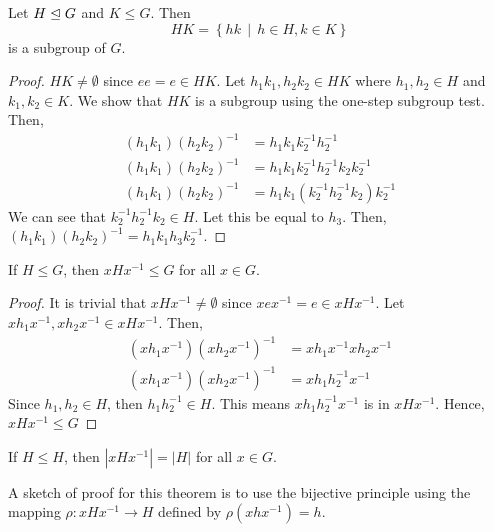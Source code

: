     \begin{thm}
        Let \(H \trianglelefteq G\) and \(K \leq G\). Then \[HK = \left\{hk \,\mid\, h\in H, k\in K\right\}\] is a subgroup of \(G\).
    \end{thm}

    \begin{proof}
        \(HK \neq \emptyset\) since \(ee = e \in HK\). Let \(h_1 k_1, h_2 k_2 \in HK\) where \(h_1, h_2 \in H\) and \(k_1, k_2 \in K\). We show that \(HK\) is a subgroup using the one-step subgroup test. Then, 
        \begin{align*}
            (h_1k_1)(h_2k_2)^{-1} &= h_1k_1k_2^{-1}h_2^{-1} \\
            (h_1k_1)(h_2k_2)^{-1} &= h_1k_1k_2^{-1}h_2^{-1}k_2k_2^{-1} \\
            (h_1k_1)(h_2k_2)^{-1} &= h_1k_1(k_2^{-1}h_2^{-1}k_2)k_2^{-1}
        \end{align*}
        We can see that \(k_2^{-1}h_2^{-1}k_2 \in H\). Let this be equal to \(h_3\). Then, \((h_1k_1)(h_2k_2)^{-1} = h_1k_1h_3k_2^{-1}\).
    \end{proof}

    \begin{thm}
        If \(H \leq G\), then \(xHx^{-1} \leq G\) for all \(x \in G\).
    \end{thm}

    \begin{proof}
        It is trivial that \(xHx^{-1} \neq \emptyset\) since \(xex^{-1} = e \in xHx^{-1}\). Let \(xh_1x^{-1}, xh_2x^{-1} \in xHx^{-1}\). Then,
        \begin{align*}
            (xh_1x^{-1})(xh_2x^{-1})^{-1} &= xh_1x^{-1}xh_2x^{-1} \\
            (xh_1x^{-1})(xh_2x^{-1})^{-1} &= xh_1h_2^{-1}x^{-1}
        \end{align*}
        Since \(h_1, h_2\in H\), then \(h_1h_2^{-1} \in H\). This means \(xh_1h_2^{-1}x^{-1}\) is in \(xHx^{-1}\). Hence, \(xHx^{-1} \leq G\)
    \end{proof}

    \begin{thm}
        If \(H \leq H\), then \(|xHx^{-1}| = |H|\) for all \(x\in G\).
    \end{thm}

    A sketch of proof for this theorem is to use the bijective principle using the mapping \(\rho : xHx^{-1} \to H\) defined by \(\rho(xhx^{-1}) = h\).

